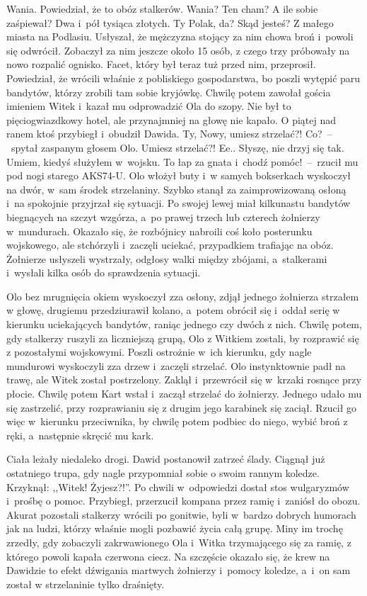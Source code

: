 \documentclass[../MAIN.tex]{subfiles}
\begin{document}
Wania. Powiedział, że to obóz stalkerów.
\xx Wania? Ten cham? A ile sobie zaśpiewał?
\xx Dwa i~pół tysiąca złotych.
\xx Ty Polak, da? Skąd jesteś?
\xx Z małego miasta na Podlasiu.
\qm
Usłyszał, że mężczyzna stojący za nim chowa broń i~powoli się odwrócił. Zobaczył
za nim jeszcze około 15 osób, z czego trzy próbowały na nowo rozpalić ognisko.
Facet, który był teraz tuż przed nim, przeprosił. Powiedział, że wrócili właśnie
z pobliskiego gospodarstwa, bo poszli wytępić paru bandytów, którzy zrobili tam
sobie kryjówkę. Chwilę potem zawołał gościa imieniem Witek i~kazał mu
odprowadzić Ola do szopy. Nie był to pięciogwiazdkowy hotel, ale przynajmniej na
głowę nie kapało.
%
O piątej nad ranem ktoś przybiegł i~obudził Dawida.
\sd
\xx Ty, Nowy, umiesz strzelać?!
\xx Co?~--~spytał zaspanym głosem Olo.
\xx Umiesz strzelać?!
\xx Ee.. Słyszę, nie drzyj się tak. Umiem, kiedyś służyłem w~wojsku.
\xx To łap za gnata i~chodź pomóc!~--~rzucił mu pod nogi starego AKS74-U.
\qm
Olo włożył buty i~w samych bokserkach wyskoczył na dwór, w~sam środek
strzelaniny. Szybko stanął za zaimprowizowaną osłoną i~na spokojnie przyjrzał
się sytuacji. Po swojej lewej miał kilkunastu bandytów biegnących na szczyt
wzgórza, a~po prawej trzech lub czterech żołnierzy w~mundurach. Okazało się, że
rozbójnicy nabroili coś koło posterunku wojskowego, ale stchórzyli i~zaczęli
uciekać, przypadkiem trafiając na obóz. Żołnierze usłyszeli wystrzały, odgłosy
walki między zbójami, a~stalkerami i~wysłali kilka osób do sprawdzenia sytuacji.

Olo bez mrugnięcia okiem wyskoczył zza osłony, zdjął jednego żołnierza strzałem
w głowę, drugiemu przedziurawił kolano, a~potem obrócił się i~oddał serię w
kierunku uciekających bandytów, raniąc jednego czy dwóch z nich. Chwilę potem,
gdy stalkerzy ruszyli za liczniejszą grupą, Olo z Witkiem zostali, by rozprawić
się z pozostałymi wojskowymi. Poszli ostrożnie w~ich kierunku, gdy nagle
mundurowi wyskoczyli zza drzew i~zaczęli strzelać. Olo instynktownie padł na
trawę, ale Witek został postrzelony. Zaklął i~przewrócił się w~krzaki rosnące
przy płocie. Chwilę potem Kart wstał i~zaczął strzelać do żołnierzy. Jednego
udało mu się zastrzelić, przy rozprawianiu się z drugim jego karabinek się
zaciął. Rzucił go więc w~kierunku przeciwnika, by chwilę potem podbiec do niego,
wybić broń z ręki, a~następnie skręcić mu kark.

Ciała leżały niedaleko drogi. Dawid postanowił zatrzeć ślady. Ciągnął już
ostatniego trupa, gdy nagle przypomniał sobie o swoim rannym koledze. Krzyknął:
,,Witek! Żyjesz?!''. Po chwili w~odpowiedzi dostał stos wulgaryzmów i~prośbę o
pomoc. Przybiegł, przerzucił kompana przez ramię i~zaniósł do obozu. Akurat
pozostali stalkerzy wrócili po gonitwie, byli w~bardzo dobrych humorach jak na
ludzi, którzy właśnie mogli pozbawić życia całą grupę. Miny im trochę zrzedły, gdy zobaczyli zakrwawionego Ola i~Witka trzymającego się za ramię, z którego powoli kapała czerwona ciecz. Na szczęście okazało się, że krew na Dawidzie to
efekt dźwigania martwych żołnierzy i~pomocy koledze, a~i~on sam został w
strzelaninie tylko draśnięty.
\end{document}
